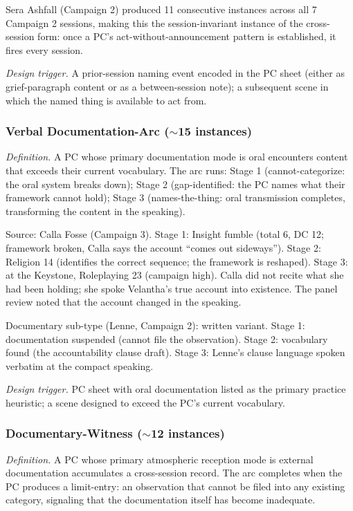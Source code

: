 Sera Ashfall (Campaign 2) produced 11 consecutive instances across all 7 Campaign 2
sessions, making this the session-invariant instance of the cross-session form: once
a PC's act-without-announcement pattern is established, it fires every session.

\textit{Design trigger.} A prior-session naming event encoded in the PC sheet (either
as grief-paragraph content or as a between-session note); a subsequent scene in which
the named thing is available to act from.

\subsubsection{Verbal Documentation-Arc ($\sim$15 instances)}

\textit{Definition.} A PC whose primary documentation mode is oral encounters content
that exceeds their current vocabulary. The arc runs: Stage 1 (cannot-categorize:
the oral system breaks down); Stage 2 (gap-identified: the PC names what their
framework cannot hold); Stage 3 (names-the-thing: oral transmission completes,
transforming the content in the speaking).

Source: Calla Fosse (Campaign 3). Stage 1: Insight fumble (total 6, DC 12; framework
broken, Calla says the account ``comes out sideways''). Stage 2: Religion 14 (identifies
the correct sequence; the framework is reshaped). Stage 3: at the Keystone, Roleplaying
23 (campaign high). Calla did not recite what she had been holding; she spoke
Velantha's true account into existence. The panel review noted that the account changed
in the speaking.

Documentary sub-type (Lenne, Campaign 2): written variant. Stage 1: documentation
suspended (cannot file the observation). Stage 2: vocabulary found (the accountability
clause draft). Stage 3: Lenne's clause language spoken verbatim at the compact speaking.

\textit{Design trigger.} PC sheet with oral documentation listed as the primary
practice heuristic; a scene designed to exceed the PC's current vocabulary.

\subsubsection{Documentary-Witness ($\sim$12 instances)}

\textit{Definition.} A PC whose primary atmospheric reception mode is external
documentation accumulates a cross-session record. The arc completes when the PC
produces a limit-entry: an observation that cannot be filed into any existing category,
signaling that the documentation itself has become inadequate.

